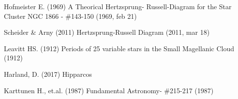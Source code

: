 \begin{thebibliography}

  \bibitem[Hofmeister(1969)]{} Hofmeister E. (1969) A Theorical Hertzsprung- Russell-Diagram for the Star Cluster NGC 1866 - \#143-150  (1969, feb 21)

   Scheider \& Arny (2011) Hertzsprung-Russell Diagram (2011, mar 18)

  \bibitem[Leavitt(1912)]{} Leavitt HS. (1912) Periods of 25 variable stars in the Small Magellanic Cloud (1912)

  \bibitem[Harland(2016)]{} Harland, D. (2017) Hipparcos

  \bibitem[Karttunen et.al.(1987)]{} Karttunen H., et.al. (1987) Fundamental Astronomy- \#215-217  (1987)

\end{thebibliography}